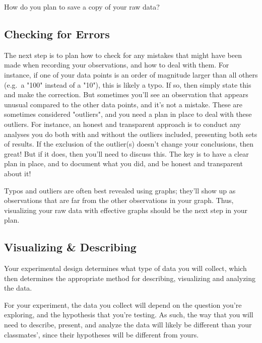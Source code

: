 \documentclass[
]{book}
\begin{document}
How do you plan to save a copy of your raw data?

\hypertarget{checking-for-errors}{%
\subsection*{Checking for Errors}\label{checking-for-errors}}

The next step is to plan how to check for any mistakes that might have been made when recording your observations, and how to deal with them. For instance, if one of your data points is an order of magnitude larger than all others (e.g.~a "100" instead of a "10"), this is likely a typo. If so, then simply state this and make the correction. But sometimes you'll see an observation that appears unusual compared to the other data points, and it's not a mistake. These are sometimes considered "outliers", and you need a plan in place to deal with these outliers. For instance, an honest and transparent approach is to conduct any analyses you do both with and without the outliers included, presenting both sets of results. If the exclusion of the outlier(s) doesn't change your conclusions, then great! But if it does, then you'll need to discuss this. The key is to have a clear plan in place, and to document what you did, and be honest and transparent about it!

Typos and outliers are often best revealed using graphs; they'll show up as observations that are far from the other observations in your graph. Thus, visualizing your raw data with effective graphs should be the next step in your plan.

\hypertarget{visualizing-describing}{%
\subsection*{Visualizing \& Describing}\label{visualizing-describing}}

Your experimental design determines what type of data you will collect, which then determines the appropriate method for describing, visualizing and analyzing the data.

For your experiment, the data you collect will depend on the question you're exploring, and the hypothesis that you're testing. As such, the way that you will need to describe, present, and analyze the data will likely be different than your classmates', since their hypotheses will be different from yours.
\end{document}
